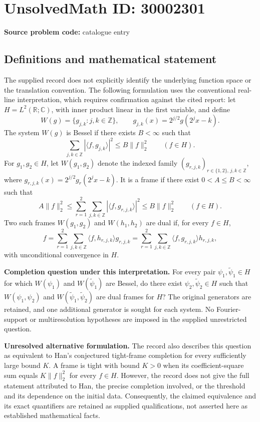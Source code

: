 \documentclass[11pt]{article}
\newcommand{\Z}{\mathbb{Z}}
\newcommand{\R}{\mathbb{R}}
\newcommand{\C}{\mathbb{C}}
\begin{document}
\section*{UnsolvedMath ID: 30002301}
\textbf{Source problem code:} catalogue entry
\subsection{Definitions and mathematical statement}
The supplied record does not explicitly identify the underlying function space or the translation convention. The following formulation uses the conventional real-line interpretation, which requires confirmation against the cited report: let \(H=L^2(\R;\C)\), with inner product linear in the first variable, and define
\[
W(g)=\{g_{j,k}:j,k\in\Z\},\qquad g_{j,k}(x)=2^{j/2}g(2^j x-k).
\]
The system \(W(g)\) is Bessel if there exists \(B<\infty\) such that
\[
\sum_{j,k\in\Z}|\langle f,g_{j,k}\rangle|^2\le B\|f\|_2^2\qquad(f\in H).
\]
For \(g_1,g_2\in H\), let \(W(g_1,g_2)\) denote the indexed family \((g_{r,j,k})_{r\in\{1,2\},\,j,k\in\Z}\), where \(g_{r,j,k}(x)=2^{j/2}g_r(2^j x-k)\). It is a frame if there exist \(0<A\le B<\infty\) such that
\[
A\|f\|_2^2\le\sum_{r=1}^2\sum_{j,k\in\Z}|\langle f,g_{r,j,k}\rangle|^2\le B\|f\|_2^2\qquad(f\in H).
\]
Two such frames \(W(g_1,g_2)\) and \(W(h_1,h_2)\) are dual if, for every \(f\in H\),
\[
f=\sum_{r=1}^2\sum_{j,k\in\Z}\langle f,h_{r,j,k}\rangle g_{r,j,k}
 =\sum_{r=1}^2\sum_{j,k\in\Z}\langle f,g_{r,j,k}\rangle h_{r,j,k},
\]
with unconditional convergence in \(H\).

\textbf{Completion question under this interpretation.} For every pair \(\psi_1,\widetilde\psi_1\in H\) for which \(W(\psi_1)\) and \(W(\widetilde\psi_1)\) are Bessel, do there exist \(\psi_2,\widetilde\psi_2\in H\) such that \(W(\psi_1,\psi_2)\) and \(W(\widetilde\psi_1,\widetilde\psi_2)\) are dual frames for \(H\)? The original generators are retained, and one additional generator is sought for each system. No Fourier-support or multiresolution hypotheses are imposed in the supplied unrestricted question.

\textbf{Unresolved alternative formulation.} The record also describes this question as equivalent to Han's conjectured tight-frame completion for every sufficiently large bound \(K\). A frame is tight with bound \(K>0\) when its coefficient-square sum equals \(K\|f\|_2^2\) for every \(f\in H\). However, the record does not give the full statement attributed to Han, the precise completion involved, or the threshold and its dependence on the initial data. Consequently, the claimed equivalence and its exact quantifiers are retained as supplied qualifications, not asserted here as established mathematical facts.
\end{document}
